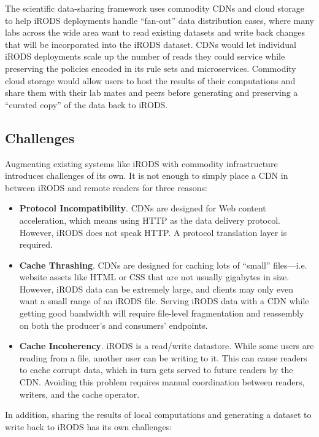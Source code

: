The scientific data-sharing framework uses commodity CDNs and cloud storage to help iRODS deployments
handle ``fan-out'' data distribution cases, where many labs across the wide
area want to read existing datasets and write back changes that will be
incorporated into the iRODS dataset.  CDNs would let individual iRODS
deployments scale up the number of reads they could service while preserving the
policies encoded in its rule sets and microservices.  Commodity cloud
storage would allow users to host the results of their computations and share
them with their lab mates and peers before generating and preserving a
``curated copy'' of the data back to iRODS.

\subsection{Challenges}

Augmenting existing systems like iRODS
with commodity infrastructure introduces challenges of
its own.  It is not enough to simply place a CDN in between iRODS and remote readers for
three reasons:

\begin{itemize}
\item \textbf{Protocol Incompatibility}.  CDNs are designed for Web content
acceleration, which means
using HTTP as the data delivery protocol.  However,
iRODS does not speak HTTP.  A protocol translation layer is required.
\item \textbf{Cache Thrashing}.  CDNs are designed for caching lots of
``small'' files---i.e. website assets like HTML or CSS that are not usually
gigabytes in size.  However, iRODS data can be extremely large, and clients may
only even want a small range of an iRODS file.  Serving iRODS data with a CDN
while getting good bandwidth will require file-level fragmentation and reassembly
on both the producer's and consumers' endpoints.
\item \textbf{Cache Incoherency}.  iRODS is a read/write datastore.
While some users are reading from a file, another user can be writing to it.
This can cause readers to cache corrupt data, which in turn gets served to
future readers by the CDN.  Avoiding this problem requires manual coordination
between readers, writers, and the cache operator.
\end{itemize}

In addition, sharing the results of local computations and generating a
dataset to write back to iRODS has its own challenges:

